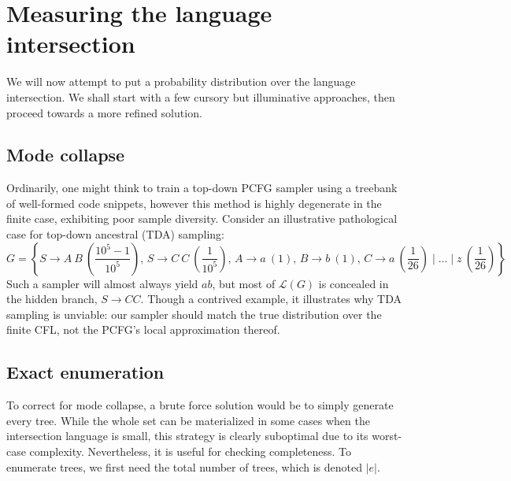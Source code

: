\documentclass[sigplan,review,acmsmall,nonacm,screen,anonymous]{acmart}\settopmatter{printfolios=false,printccs=false,printacmref=false}
\begin{document}
\clearpage

\section{Measuring the language intersection}\label{sec:measurement}

We will now attempt to put a probability distribution over the language intersection. We shall start with a few cursory but illuminative approaches, then proceed towards a more refined solution.

\subsection{Mode collapse}

Ordinarily, one might think to train a top-down PCFG sampler using a treebank of well-formed code snippets, however this method is highly degenerate in the finite case, exhibiting poor sample diversity. Consider an illustrative pathological case for top-down ancestral (TDA) sampling:
$$
G=\left\{ S \rightarrow A\:B \: \left(\frac{10^5 - 1}{10^5}\right), \hspace{2pt}
     S \rightarrow C\:C \: \left(\frac{1}{10^5}\right), \hspace{2pt}
     A \rightarrow a \: (1), \hspace{2pt}
     B  \rightarrow b \: (1), \hspace{2pt}
     C  \rightarrow a \: \left(\frac{1}{26}\right) \mid \ldots \mid z \: \left(\frac{1}{26}\right)\right\}
$$
Such a sampler will almost always yield $a b$, but most of $\mathcal{L}(G)$ is concealed in the hidden branch, $S \rightarrow C C$. Though a contrived example, it illustrates why TDA sampling is unviable: our sampler should match the true distribution over the finite CFL, not the PCFG's local approximation thereof.

\subsection{Exact enumeration}

To correct for mode collapse, a brute force solution would be to simply generate every tree. While the whole set can be materialized in some cases when the intersection language is small, this strategy is clearly suboptimal due to its worst-case complexity. Nevertheless, it is useful for checking completeness. To enumerate trees, we first need the total number of trees, which is denoted $|e|$.
\end{document}
